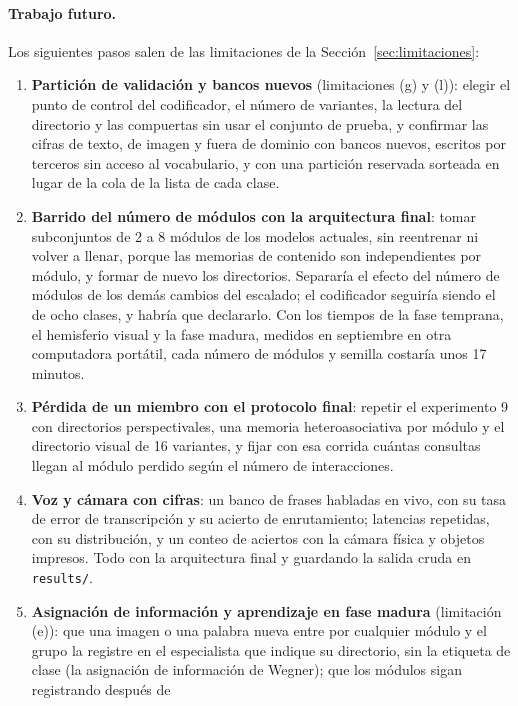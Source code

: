 \paragraph{Trabajo futuro.}
Los siguientes pasos salen de las limitaciones de la Sección~\ref{sec:limitaciones}:
\begin{enumerate}
    \item \textbf{Partición de validación y bancos nuevos} (limitaciones (g) y (l)): elegir el
    punto de control del codificador, el número de variantes, la lectura del directorio y
    las compuertas sin usar el conjunto de prueba, y confirmar las cifras de texto, de
    imagen y fuera de dominio con bancos nuevos, escritos por terceros sin acceso al
    vocabulario, y con una partición reservada sorteada en lugar de la cola de la lista
    de cada clase.
    \item \textbf{Barrido del número de módulos con la arquitectura final}: tomar
    subconjuntos de 2 a 8 módulos de los modelos actuales, sin reentrenar ni volver a
    llenar, porque las memorias de contenido son independientes por módulo, y formar de
    nuevo los directorios.
    Separaría el efecto del número de módulos de los demás cambios del escalado; el
    codificador seguiría siendo el de ocho clases, y habría que declararlo.
    Con los tiempos de la fase temprana, el hemisferio visual y la fase madura, medidos en
    septiembre en otra computadora portátil, cada número de módulos y semilla costaría
    unos 17 minutos.
    \item \textbf{Pérdida de un miembro con el protocolo final}: repetir el experimento 9
    con directorios perspectivales, una memoria heteroasociativa por módulo y el
    directorio visual de 16 variantes, y fijar con esa corrida cuántas consultas llegan al
    módulo perdido según el número de interacciones.
    \item \textbf{Voz y cámara con cifras}: un banco de frases habladas en vivo, con su
    tasa de error de transcripción y su acierto de enrutamiento; latencias repetidas, con
    su distribución, y un conteo de aciertos con la cámara física y objetos impresos.
    Todo con la arquitectura final y guardando la salida cruda en \texttt{results/}.
    \item \textbf{Asignación de información y aprendizaje en fase madura} (limitación
    (e)): que una imagen o una palabra nueva entre por cualquier módulo y el grupo la
    registre en el especialista que indique su directorio, sin la etiqueta de clase (la
    asignación de información de Wegner); que los módulos sigan registrando después de

\end{enumerate}
